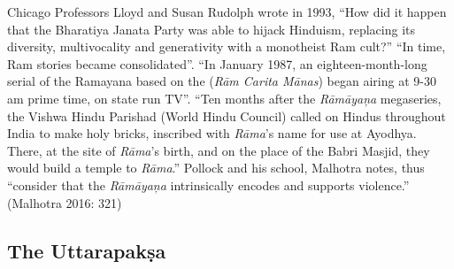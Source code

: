  \item Chicago Professors Lloyd and Susan Rudolph wrote in 1993, “How did it happen that the Bharatiya Janata Party was able to hijack Hinduism, replacing its diversity, multivocality and generativity with a monotheist Ram cult?” “In time, Ram stories became consolidated”. “In January 1987, an eighteen-month-long serial of the Ramayana based on the (\textit{Rām Carita Mānas}) began airing at 9-30 am prime time, on state run TV”. “Ten months after the \textit{Rāmāyaņa} megaseries, the Vishwa Hindu Parishad (World Hindu Council) called on Hindus throughout India to make holy bricks, inscribed with \textit{Rāma}’s name for use at Ayodhya. There, at the site of \textit{Rāma}’s birth, and on the place of the Babri Masjid, they would build a temple to \textit{Rāma}.” Pollock and his school, Malhotra notes, thus “consider that the \textit{Rāmāyaņa} intrinsically encodes and supports violence.” (Malhotra 2016: 321)



\subsection{The Uttarapakṣa}

